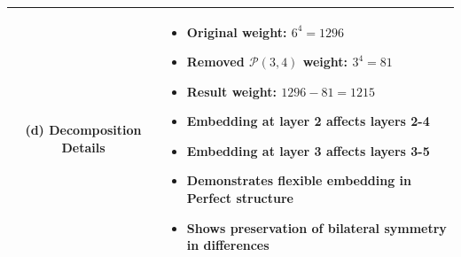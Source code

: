 \documentclass[11pt]{article}
\newcommand{\perfect}{\mathcal{P}}
\begin{document}
\begin{table}[ht]
{\begin{tabular}{cl}
\addlinespace[2ex]
\midrule
\textbf{(d) Decomposition Details} &
\begin{minipage}{0.7\textwidth}
\begin{itemize}
\item Original weight: $6^4 = 1296$
\item Removed $\perfect(3,4)$ weight: $3^4 = 81$
\item Result weight: $1296 - 81 = 1215$
\item Embedding at layer 2 affects layers 2-4
\item Embedding at layer 3 affects layers 3-5
\item Demonstrates flexible embedding in Perfect structure
\item Shows preservation of bilateral symmetry in differences
\end{itemize}
\end{minipage} \\
\bottomrule
\end{tabular}
}
\end{table}

\end{document}
